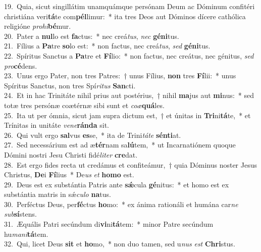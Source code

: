 {19.~}Quia, sicut singillátim unamquámque persónam Deum ac Dóminum confitéri christiána veri\textbf{tá}te com\textbf{pél}limur:~* ita tres Deos aut Dóminos dícere cathólica religióne \textit{pro}\textit{hi}\textbf{bé}mur.\\
{20.~}Pater a \textbf{nul}lo est \textbf{fa}ctus:~* nec creá\textit{tus}, \textit{nec} \textbf{gé}\textbf{ni}tus.\\
{21.~}Fílius a \textbf{Pa}tre \textbf{so}lo est:~* non factus, nec creá\textit{tus}, \textit{sed} \textbf{gé}\textbf{ni}tus.\\
{22.~}Spíritus Sanctus a \textbf{Pa}tre et \textbf{Fí}lio:~* non factus, nec creátus, nec génitus, \textit{sed} \textit{pro}\textbf{cé}dens.\\
{23.~}Unus ergo Pater, non tres Patres:~† unus Fílius, \textbf{non} tres \textbf{Fí}lii:~* unus Spíritus Sanctus, non tres Spí\textit{ri}\textit{tus} \textbf{San}cti.\\
{24.~}Et in hac Trinitáte nihil prius aut postérius,~† nihil \textbf{ma}jus aut \textbf{mi}nus:~* sed totæ tres persónæ coætérnæ sibi sunt et \textit{co}\textit{æ}\textbf{quá}les.\\
{25.~}Ita ut per ómnia, sicut jam supra dictum est,~† et únitas in \textbf{Tri}ni\textbf{tá}te,~* et Trínitas in unitáte \textit{ve}\textit{ne}\textbf{rán}\textbf{da} sit.\\
{26.~}Qui vult ergo \textbf{sal}vus \textbf{es}se,~* ita de Trini\textit{tá}\textit{te} \textbf{sén}\textbf{ti}at.\\
{27.~}Sed necessárium est ad æ\textbf{tér}nam sa\textbf{lú}tem,~* ut Incarnatiónem quoque Dómini nostri Jesu Christi fidé\textit{li}\textit{ter} \textbf{cre}dat.\\
{28.~}Est ergo fides recta ut credámus et confiteámur,~† quia Dóminus noster Jesus Christus, \textbf{De}i \textbf{Fí}lius~* De\textit{us} \textit{et} \textbf{ho}\textbf{mo} est.\\
{29.~}Deus est ex substántia Patris ante \textbf{sǽ}cula \textbf{gé}nitus:~* et homo est ex substántia matris in sǽ\textit{cu}\textit{lo} \textbf{na}tus.\\
{30.~}Perféctus Deus, per\textbf{fé}ctus \textbf{ho}mo:~* ex ánima rationáli et humána car\textit{ne} \textit{sub}\textbf{sí}stens.\\
{31.~}Æquális Patri secúndum di\textbf{vi}ni\textbf{tá}tem:~* minor Patre secúndum hu\textit{ma}\textit{ni}\textbf{tá}tem.\\
{32.~}Qui, licet Deus \textbf{sit} et \textbf{ho}mo,~* non duo tamen, sed u\textit{nus} \textit{est} \textbf{Chri}stus.\\
